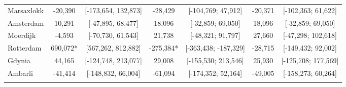 \begin{table}[ht]
\begin{adjustbox}{max width=\textwidth}
\begin{tabular}{lcccccc}
  Marsaxlokk &  -20,390 & [-173,654, 132,873] &  -28,429 & [-104,769; 47,912] & -20,371 & [-102,363; 61,622] \\ 
  Amsterdam &   10,291 & [-47,895, 68,477] &   18,096 & [-32,859; 69,050] &  18,096 & [-32,859; 69,050] \\ 
  Moerdijk &   -4,593 & [-70,730, 61,543] &   21,738 & [-48,321; 91,797] &  27,660 & [-47,298; 102,618] \\ 
  Rotterdam &  690,072* & [567,262, 812,882] & -275,384* & [-363,438; -187,329] & -28,715 & [-149,432; 92,002] \\ 
  Gdynia &   44,165 & [-124,748, 213,077] &   29,008 & [-155,530; 213,546] &  25,930 & [-125,708; 177,569] \\ 
  Ambarli &  -41,414 & [-148,832, 66,004] &  -61,094 & [-174,352; 52,164] & -49,005 & [-158,273; 60,264] \\ 
   [2ex] \hline \hline {}\end{tabular} 
 \end{adjustbox}
\endgroup
\end{table}
